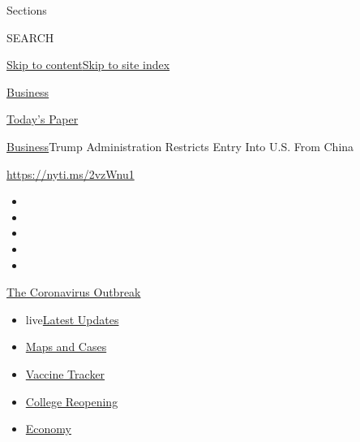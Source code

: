 Sections

SEARCH

\protect\hyperlink{site-content}{Skip to
content}\protect\hyperlink{site-index}{Skip to site index}

\href{https://www.nytimes.com/section/business}{Business}

\href{https://myaccount.nytimes.com/auth/login?response_type=cookie\&client_id=vi}{}

\href{https://www.nytimes.com/section/todayspaper}{Today's Paper}

\href{/section/business}{Business}\textbar{}Trump Administration
Restricts Entry Into U.S. From China

\url{https://nyti.ms/2vzWnu1}

\begin{itemize}
\item
\item
\item
\item
\item
\end{itemize}

\href{https://www.nytimes.com/news-event/coronavirus?action=click\&pgtype=Article\&state=default\&region=TOP_BANNER\&context=storylines_menu}{The
Coronavirus Outbreak}

\begin{itemize}
\tightlist
\item
  live\href{https://www.nytimes.com/2020/08/04/world/coronavirus-cases.html?action=click\&pgtype=Article\&state=default\&region=TOP_BANNER\&context=storylines_menu}{Latest
  Updates}
\item
  \href{https://www.nytimes.com/interactive/2020/us/coronavirus-us-cases.html?action=click\&pgtype=Article\&state=default\&region=TOP_BANNER\&context=storylines_menu}{Maps
  and Cases}
\item
  \href{https://www.nytimes.com/interactive/2020/science/coronavirus-vaccine-tracker.html?action=click\&pgtype=Article\&state=default\&region=TOP_BANNER\&context=storylines_menu}{Vaccine
  Tracker}
\item
  \href{https://www.nytimes.com/2020/08/02/us/covid-college-reopening.html?action=click\&pgtype=Article\&state=default\&region=TOP_BANNER\&context=storylines_menu}{College
  Reopening}
\item
  \href{https://www.nytimes.com/live/2020/08/04/business/stock-market-today-coronavirus?action=click\&pgtype=Article\&state=default\&region=TOP_BANNER\&context=storylines_menu}{Economy}
\end{itemize}

